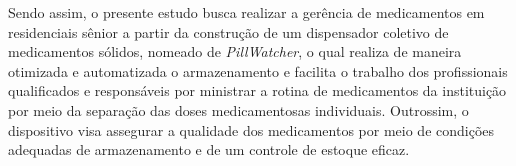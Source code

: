 Sendo assim, o presente estudo busca realizar a gerência de medicamentos em residenciais sênior a partir da construção de um dispensador coletivo de medicamentos sólidos, nomeado de \textit{PillWatcher}, o qual realiza de maneira otimizada e automatizada o armazenamento e facilita o trabalho dos profissionais qualificados e responsáveis por ministrar a rotina de medicamentos da instituição por meio da separação das doses medicamentosas individuais. Outrossim, o dispositivo visa assegurar a qualidade dos medicamentos por meio de condições adequadas de armazenamento e de um controle de estoque eficaz.
